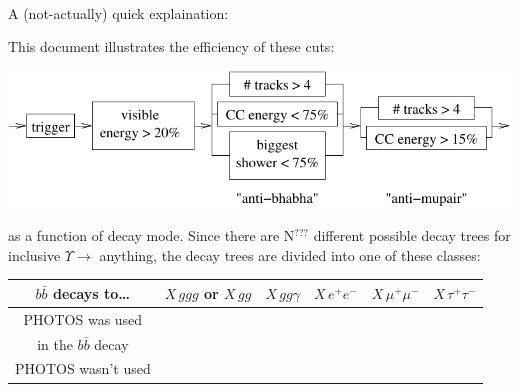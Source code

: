 \documentclass[landscape]{article}
\begin{document}
\Large
\renewcommand{\labelitemi}{-}
\setlength{\parindent}{0 cm}

\mbox{ }

\vspace{0.5 cm}

\begin{center}
\end{center}

\vspace{1 cm}

A (not-actually) quick explaination:

\vspace{0.2 cm} \hspace{0.2 cm} This document illustrates the efficiency of these cuts:
\begin{center}
  \includegraphics[width=0.5\linewidth]{analysismc_cuts.pdf}
\end{center}
as a function of decay mode.  Since there are N$^{\mbox{???}}$ different
possible decay trees for inclusive $\Upsilon \to$ anything, the decay
trees are divided into one of these classes:

\begin{center}
  \begin{tabular}{c | c | c | c | c | c}
    $b\bar{b}$ decays to\ldots & $X\,ggg$ or $X\,gg$ & $X\,gg\gamma$ & $X\,e^+e^-$ & $X\,\mu^+\mu^-$ & $X\,\tau^+\tau^-$ \\\hline
    PHOTOS was used & & & & & \\
    in the $b\bar{b}$ decay & & & & & \\\hline
    PHOTOS wasn't used & & & & & \\
  \end{tabular}
\end{center}
\end{document}
